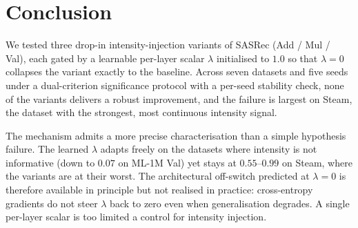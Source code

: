 \section{Conclusion}
\label{sec:conclusion}

We tested three drop-in intensity-injection variants of SASRec
(Add / Mul / Val), each gated by a learnable per-layer scalar
$\lambda$ initialised to $1.0$ so that $\lambda{=}0$ collapses the
variant exactly to the baseline. Across seven datasets and five seeds
under a dual-criterion significance protocol with a per-seed
stability check, none of the variants
delivers a robust improvement, and the failure is largest on Steam,
the dataset with the strongest, most continuous intensity signal.

The mechanism admits a more precise characterisation than a simple hypothesis failure. The
learned $\lambda$ adapts freely on the datasets where intensity is
not informative (down to $0.07$ on ML-1M Val) yet stays at $0.55$--$0.99$
on Steam, where the variants are at their worst. The architectural
off-switch predicted at $\lambda{=}0$ is therefore available in principle
but not realised in practice: cross-entropy gradients do not steer
$\lambda$ back to zero even when generalisation degrades. A single
per-layer scalar is too limited a control for intensity injection.


